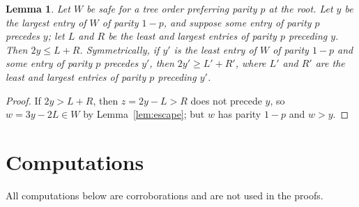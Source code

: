\documentclass[11pt]{amsart}
\newtheorem{lemma}[theorem]{Lemma}
\theoremstyle{definition}
\theoremstyle{remark}
\begin{document}
\begin{lemma}\label{lem:largest}
Let $W$ be safe for a tree order preferring parity $p$ at the root. Let $y$ be the largest entry of $W$ of parity $1-p$, and suppose some entry of parity $p$ precedes $y$; let $L$ and $R$ be the least and largest entries of parity $p$ preceding $y$. Then $2y\le L+R$. Symmetrically, if $y'$ is the least entry of $W$ of parity $1-p$ and some entry of parity $p$ precedes $y'$, then $2y'\ge L'+R'$, where $L'$ and $R'$ are the least and largest entries of parity $p$ preceding $y'$.
\end{lemma}

\begin{proof}
If $2y>L+R$, then $z=2y-L>R$ does not precede $y$, so $w=3y-2L\in W$ by Lemma~\ref{lem:escape}; but $w$ has parity $1-p$ and $w>y$.
\end{proof}

\section{Computations}\label{sec:comp}

All computations below are corroborations and are not used in the proofs.
\end{document}
